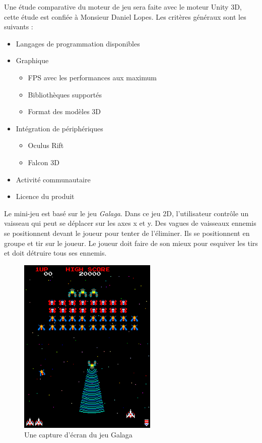 \documentclass[11pt, a4paper]{article}
\begin{document}
Une étude comparative du moteur de jeu sera faite avec le moteur Unity 3D, cette étude est confiée à Monsieur Daniel Lopes. Les critères généraux sont les suivants :\\

\begin{itemize}
\item Langages de programmation disponibles
\item Graphique
	\begin{itemize}
	\item FPS avec les performances aux maximum
	\item Bibliothèques supportés
	\item Format des modèles 3D
	\end{itemize}
\item Intégration de périphériques
	\begin{itemize}
	\item Oculus Rift
	\item Falcon 3D
	\end{itemize}
\item Activité communautaire
\item Licence du produit\\
\end{itemize}

Le mini-jeu est basé sur le jeu \textit{Galaga}. Dans ce jeu 2D, l'utilisateur contrôle un vaisseau qui peut se déplacer sur les axes x et y. Des vagues de vaisseaux ennemis se positionnent devant le joueur pour tenter de l'éliminer. Ils se positionnent en groupe et tir sur le joueur. Le joueur doit faire de son mieux pour esquiver les tirs et doit détruire tous ses ennemis. 

\begin{figure}[H]
	\begin{center}
	\includegraphics[scale=.9]{Galaga}
	\caption{Une capture d'écran du jeu Galaga}
	\end{center}
\end{figure}
\end{document}
